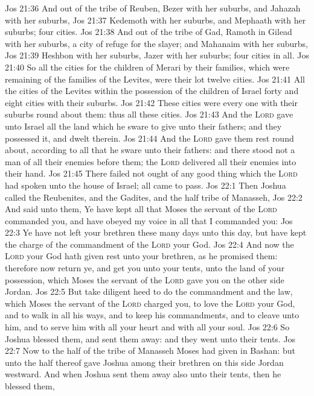\vs Jos 21:36 And out of the tribe of Reuben, Bezer with her suburbs, and Jahazah with her suburbs,
\vs Jos 21:37 Kedemoth with her suburbs, and Mephaath with her suburbs; four cities.
\vs Jos 21:38 And out of the tribe of Gad, Ramoth in Gilead with her suburbs,  a city of refuge for the slayer; and Mahanaim with her suburbs,
\vs Jos 21:39 Heshbon with her suburbs, Jazer with her suburbs; four cities in all.
\vs Jos 21:40 So all the cities for the children of Merari by their families, which were remaining of the families of the Levites, were  their lot twelve cities.
\vs Jos 21:41 All the cities of the Levites within the possession of the children of Israel  forty and eight cities with their suburbs.
\vs Jos 21:42 These cities were every one with their suburbs round about them: thus  all these cities.
\vs Jos 21:43 And the \textsc{Lord} gave unto Israel all the land which he sware to give unto their fathers; and they possessed it, and dwelt therein.
\vs Jos 21:44 And the \textsc{Lord} gave them rest round about, according to all that he sware unto their fathers: and there stood not a man of all their enemies before them; the \textsc{Lord} delivered all their enemies into their hand.
\vs Jos 21:45 There failed not ought of any good thing which the \textsc{Lord} had spoken unto the house of Israel; all came to pass.
\vs Jos 22:1 Then Joshua called the Reubenites, and the Gadites, and the half tribe of Manasseh,
\vs Jos 22:2 And said unto them, Ye have kept all that Moses the servant of the \textsc{Lord} commanded you, and have obeyed my voice in all that I commanded you:
\vs Jos 22:3 Ye have not left your brethren these many days unto this day, but have kept the charge of the commandment of the \textsc{Lord} your God.
\vs Jos 22:4 And now the \textsc{Lord} your God hath given rest unto your brethren, as he promised them: therefore now return ye, and get you unto your tents,  unto the land of your possession, which Moses the servant of the \textsc{Lord} gave you on the other side Jordan.
\vs Jos 22:5 But take diligent heed to do the commandment and the law, which Moses the servant of the \textsc{Lord} charged you, to love the \textsc{Lord} your God, and to walk in all his ways, and to keep his commandments, and to cleave unto him, and to serve him with all your heart and with all your soul.
\vs Jos 22:6 So Joshua blessed them, and sent them away: and they went unto their tents.
\vs Jos 22:7 Now to the  half of the tribe of Manasseh Moses had given  in Bashan: but unto the  half thereof gave Joshua among their brethren on this side Jordan westward. And when Joshua sent them away also unto their tents, then he blessed them,

